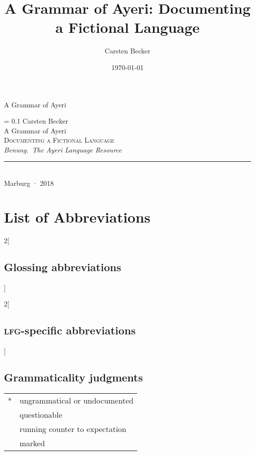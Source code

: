 \documentclass[
	a4paper,
	11pt,
	openany,
	twoside,
	oldfontcommands, %
]{memoir}
\author{Carsten Becker}
\title{A Grammar of Ayeri: Documenting a Fictional Language}
\date{\today}
\newlength\drop
\newcommand*{\titleS}{\begingroup%
\drop = 0.1\textheight
\centering
\vspace*{\drop}
{\large Carsten Becker}\\[2\baselineskip]
{\Huge A Grammar of Ayeri}\\[\baselineskip]
{\Large\scshape Documenting a Fictional Language}\\[\baselineskip]
\vfill
{\large\itshape Benung.~The Ayeri Language Resource}\\
\rule{0.5\textwidth}{0.4pt}\smallskip\\
{Marburg · 2018}\par
\vspace*{\drop}
\endgroup}
\newcommand{\excl}{\fakesuperscript{!}} %
\newcommand{\hash}{\fakesuperscript{\#}} %
\newcommand{\ques}{\fakesuperscript{?}} %
\newcommand{\Lfg}{\textsc{lfg}}
\begin{document}

\frontmatter

\begin{titlingpage}
\begin{center}
{\Huge A Grammar of Ayeri}
\end{center}
\end{titlingpage}


\begin{titlingpage}
\titleS
\clearpage

\end{titlingpage}


\begin{KeepFromToc}
  \tableofcontents
\end{KeepFromToc}
\clearpage
\listoffigures
\clearpage
\listoftables
\chapter{List of Abbreviations}
\begingroup\multicolsep=0pt
\begin{multicols}{2}[\section*{Glossing abbreviations}]
\printglossary[style=mysuper,type=leipzig]
\end{multicols}

\begin{multicols}{2}[\section*{\Lfg{}-specific abbreviations}]
\printglossary[style=mysuper,type=lfg]
\end{multicols}
\endgroup
\bigskip

\section*{Grammaticality judgments}
\noindent \begin{tabular}[t]{@{} l l}
*		& ungrammatical or undocumented \\
\ques	& questionable \\
\excl	& running counter to expectation \\
\hash	& marked \\
\end{tabular}
\end{document}
